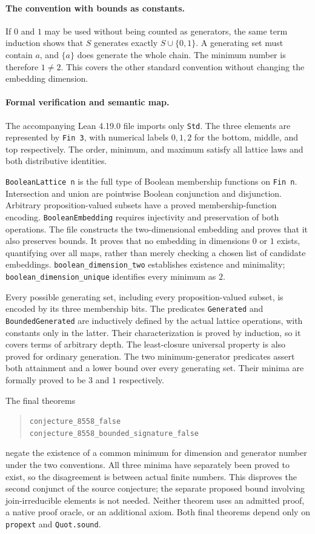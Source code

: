 \documentclass[11pt]{article}
\begin{document}
\paragraph{The convention with bounds as constants.}
If $0$ and $1$ may be used without being counted as generators,
the same term induction shows that $S$ generates exactly
$S\cup\{0,1\}$.  A generating set must contain $a$, and $\{a\}$
does generate the whole chain.  The minimum number is therefore
$1\ne2$.  This covers the other standard convention without
changing the embedding dimension.

\paragraph{Formal verification and semantic map.}
The accompanying Lean 4.19.0 file imports only \texttt{Std}.
The three elements are represented by \texttt{Fin 3}, with numerical
labels $0,1,2$ for the bottom, middle, and top respectively.
The order, minimum, and maximum satisfy all lattice laws and both
distributive identities.

\texttt{BooleanLattice n} is the full type of Boolean membership
functions on \texttt{Fin n}.  Intersection and union are pointwise
Boolean conjunction and disjunction.  Arbitrary proposition-valued
subsets have a proved membership-function encoding.
\texttt{BooleanEmbedding} requires injectivity and preservation of
both operations.  The file constructs the two-dimensional embedding
and proves that it also preserves bounds.  It proves that no embedding
in dimensions $0$ or $1$ exists, quantifying over all maps, rather
than merely checking a chosen list of candidate embeddings.
\texttt{boolean\_dimension\_two} establishes existence and minimality;
\texttt{boolean\_dimension\_unique} identifies every minimum as $2$.

Every possible generating set, including every proposition-valued
subset, is encoded by its three membership bits.  The predicates
\texttt{Generated} and \texttt{BoundedGenerated} are inductively
defined by the actual lattice operations, with constants only in
the latter.  Their characterization is proved by induction, so it
covers terms of arbitrary depth.  The least-closure universal property
is also proved for ordinary generation.
The two minimum-generator predicates assert both attainment and a
lower bound over every generating set.  Their minima are formally
proved to be $3$ and $1$ respectively.

The final theorems
\begin{quote}
\texttt{conjecture\_8558\_false}\\
\texttt{conjecture\_8558\_bounded\_signature\_false}
\end{quote}
negate the existence of a common minimum for dimension and generator
number under the two conventions.  All three minima have separately
been proved to exist, so the disagreement is between actual finite
numbers.  This disproves the second conjunct of the source conjecture;
the separate proposed bound involving join-irreducible elements is
not needed.  Neither theorem uses an admitted proof, a native proof
oracle, or an additional axiom.  Both final theorems depend only on
\texttt{propext} and \texttt{Quot.sound}.
\end{document}
